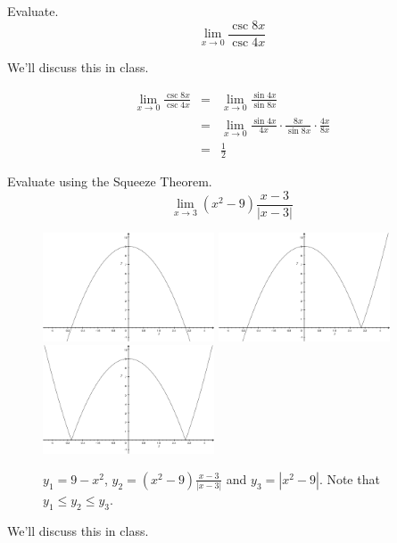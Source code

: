 \documentclass[12pt,addpoints, answers, fleqn]{exam}
\begin{document}
\begin{questions}

\question Evaluate.
\[
\mathop {\lim }\limits_{x \to 0}  \frac{\csc 8x}{ \csc 4x}
\]

\begin{solution}
We'll discuss this in class.

\begin{eqnarray*}
 \lim_{x \to 0}  \frac{\csc 8x}{ \csc 4x} &=&  \lim_{x \to 0}  \frac{\sin 4x}{ \sin 8x}\\
&=&  \lim_{x \to 0}  \frac{\sin 4x}{ 4x} \cdot \frac{8x}{ \sin 8x} \cdot \frac{4x}{8x} \\
&=& \frac{1}{2}
\end{eqnarray*}

\end{solution}


\question Evaluate using the Squeeze Theorem.
\[
\lim_{x \to 3} \left(x^2-9\right) \frac{x-3}{\left| x-3\right|}
\]

\begin{figure}[htbp] %
   \centering
   \includegraphics[width=2in]{./graphics/graphst01.pdf}
   \includegraphics[width=2in]{./graphics/graphst03.pdf}
   \includegraphics[width=2in]{./graphics/graphst02.pdf}
   \caption{$y_1 =9-x^2$,  $y_2 = \left(x^2-9\right) \displaystyle \frac{x-3}{\left| x-3\right|}$ and $y_3=\left| x^2-9\right|$. Note that $y_1 \leq y_2 \leq y_3$.}
   \label{fig:graphst}
\end{figure}
\begin{solution}
We'll discuss this in class.


\end{solution}
\end{questions}
\end{document}
